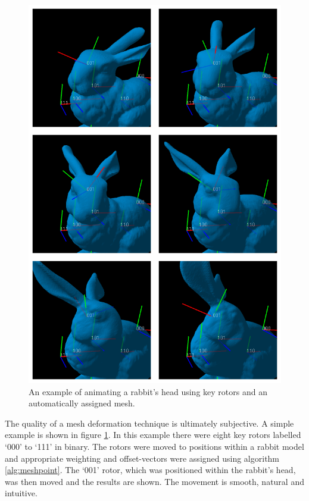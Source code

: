 \begin{figure}[p]
\centering
\includegraphics[height=0.8\textheight]{mesh_example}
\caption{\label{fig:meshexample}An example of animating a rabbit's head using key rotors and an automatically
  assigned mesh.}
\end{figure}

The quality of a mesh deformation technique is ultimately subjective. A simple
example is shown in figure \ref{fig:meshexample}. In this example there were
eight key rotors labelled `000' to `111' in binary. The rotors were moved to
positions within a rabbit model and appropriate weighting and offset-vectors
were assigned using algorithm \ref{alg:meshpoint}. The `001' rotor, which was
positioned within the rabbit's head, was then moved and the results are shown.
The movement is smooth, natural and intuitive.

